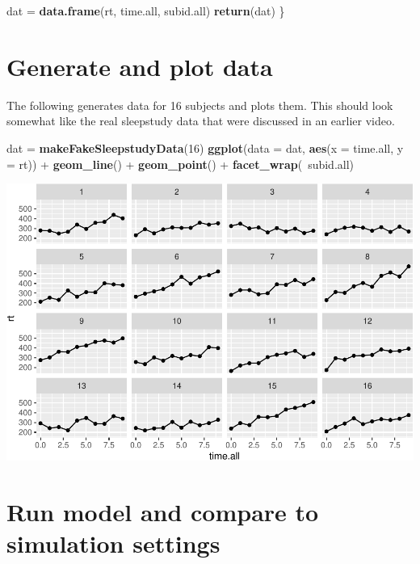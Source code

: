 \documentclass[]{book}
\newenvironment{Shaded}{\begin{snugshade}}{\end{snugshade}}
\newcommand{\KeywordTok}[1]{\textcolor[rgb]{0.13,0.29,0.53}{\textbf{{#1}}}}
\newcommand{\DataTypeTok}[1]{\textcolor[rgb]{0.13,0.29,0.53}{{#1}}}
\newcommand{\DecValTok}[1]{\textcolor[rgb]{0.00,0.00,0.81}{{#1}}}
\newcommand{\StringTok}[1]{\textcolor[rgb]{0.31,0.60,0.02}{{#1}}}
\newcommand{\NormalTok}[1]{{#1}}
\begin{document}
\begin{Shaded}
\begin{Highlighting}[]
  \NormalTok{dat =}\StringTok{ }\KeywordTok{data.frame}\NormalTok{(rt, time.all, subid.all)}
  \KeywordTok{return}\NormalTok{(dat)}
\NormalTok{\}}
\end{Highlighting}
\end{Shaded}

\section{Generate and plot data}\label{generate-and-plot-data}

The following generates data for 16 subjects and plots them. This should
look somewhat like the real sleepstudy data that were discussed in an
earlier video.

\begin{Shaded}
\begin{Highlighting}[]
\NormalTok{dat =}\StringTok{ }\KeywordTok{makeFakeSleepstudyData}\NormalTok{(}\DecValTok{16}\NormalTok{)}
\KeywordTok{ggplot}\NormalTok{(}\DataTypeTok{data =} \NormalTok{dat, }\KeywordTok{aes}\NormalTok{(}\DataTypeTok{x =} \NormalTok{time.all, }\DataTypeTok{y =} \NormalTok{rt)) +}
\StringTok{  }\KeywordTok{geom_line}\NormalTok{() +}\StringTok{ }
\StringTok{  }\KeywordTok{geom_point}\NormalTok{() +}
\StringTok{  }\KeywordTok{facet_wrap}\NormalTok{(~subid.all)}
\end{Highlighting}
\end{Shaded}

\includegraphics{MixedModelsTutorials_files/figure-latex/unnamed-chunk-3-1.pdf}

\section{Run model and compare to simulation
settings}\label{run-model-and-compare-to-simulation-settings}
\end{document}
